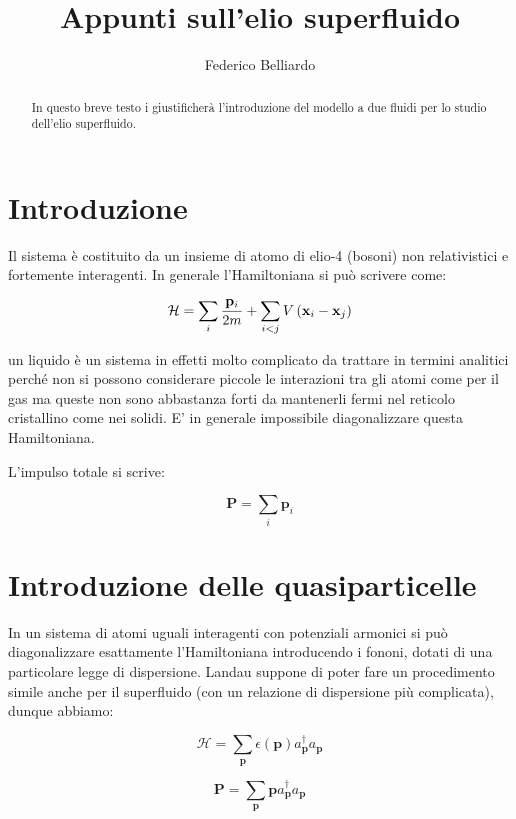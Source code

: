 \documentclass[12pt,a4paper]{article}
\author{Federico Belliardo}
\title{Appunti sull'elio superfluido}
\begin{document}
\maketitle
\begin{abstract}
In questo breve testo i giustificherà l'introduzione del modello a due fluidi per lo studio dell'elio superfluido.
\end{abstract}

\section{Introduzione}
Il sistema è costituito da un insieme di atomo di elio-4 (bosoni) non relativistici e fortemente interagenti. In generale l'Hamiltoniana si può scrivere come:

\begin{equation}
\mathcal{H} = \sum_{i} \frac{\mathbf{p}_i}{2 m} + \sum_{i < j} V \left( \bold{x}_i - \mathbf{x}_j \right) 
\end{equation}

un liquido è un sistema in effetti molto complicato da trattare in termini analitici perché non si possono considerare piccole le interazioni tra gli atomi come per il gas ma queste non sono abbastanza forti da mantenerli fermi nel reticolo cristallino come nei solidi. E' in generale impossibile diagonalizzare questa Hamiltoniana. 

L'impulso totale si scrive:

\begin{equation}
\mathbf{P} = \sum_{i} \mathbf{p}_{i}
\end{equation}

\section{Introduzione delle quasiparticelle}
In un sistema di atomi uguali interagenti con potenziali armonici si può diagonalizzare esattamente l'Hamiltoniana introducendo i fononi, dotati di una particolare legge di dispersione. Landau suppone di poter fare un procedimento simile anche per il superfluido (con un relazione di dispersione più complicata), dunque abbiamo:

\begin{equation}
\mathcal{H} = \sum_{\mathbf{p}} \epsilon \left( \mathbf{p} \right) a^{\dagger}_{\mathbf{p}} a_{\mathbf{p}}
\end{equation}

\begin{equation}
\mathbf{P} = \sum_{\mathbf{p}} \mathbf{p} a^{\dagger}_{\mathbf{p}} a_{\mathbf{p}} 
\end{equation}
\end{document}
